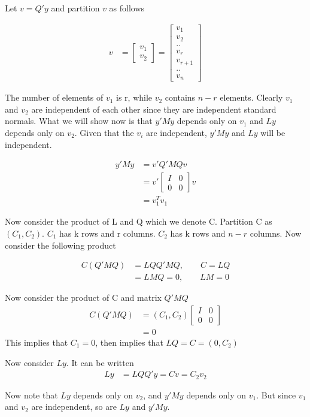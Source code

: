 \begin{itemize}
Let $v = Q' y$ and partition $v$ as follows

 \begin{align*}
	v &=  \begin{bmatrix}
	v_1\\
	v_2
	\end{bmatrix} = \begin{bmatrix}
	v_1\\
	v_2 \\
	..\\
	v_r \\
	v_{r+1}\\
	..\\
	v_n
	\end{bmatrix} 
\end{align*}

The number of elements of $v_1$ is r, while $v_2$ contains $n-r$ elements. Clearly $v_1$ and $v_2$ are independent of each other since they are independent standard normals. What we will show now is that $y' M y$ depends only on $v_1$ and $Ly$ depends only on $v_2$. Given that the $v_i$ are independent, $y' M y$ and $Ly$ will be independent. 

 \begin{align*}
	y'My &= v' Q' M Q v \\
	&= v' \begin{bmatrix}
	I & 0\\
	0 & 0
	\end{bmatrix} v \\
	&= v_1^T v_1
\end{align*}

Now consider the product of L and Q which we denote C. Partition C as $(C_1, C_2)$. $C_1$ has k rows and r columns. $C_2$ has k rows and $n-r$ columns. Now consider the following product

  \begin{align*}
	C(Q' M Q) &= L Q Q'  M Q, \qquad C=LQ\\
	&= LMQ = 0, \qquad LM = 0 
\end{align*}

Now consider the product of C and matrix $Q'MQ$
  \begin{align*}
	C(Q' M Q) &= (C_1, C_2) \begin{bmatrix}
	I & 0\\
	0 & 0
	\end{bmatrix} \\
	&= 0
\end{align*}
This implies that $C_1 = 0$, then implies that $LQ = C = (0, C_2)$

Now consider $Ly$. It can be written 
  \begin{align*}
	Ly&= LQQ'y = C v = C_2 v_2
\end{align*}

Now note that $Ly$ depends only on $v_2$, and $y'My$ depends only on $v_1$. But since $v_1$ and $v_2$ are independent, so are $Ly$ and $y'My$.



\end{itemize}

